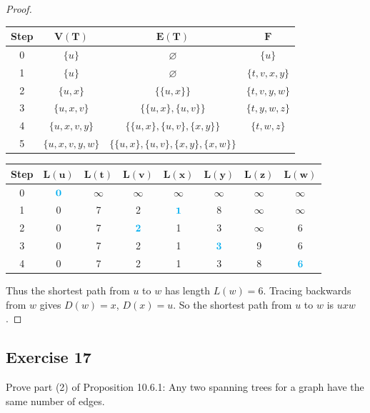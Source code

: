 \documentclass[14pt]{extarticle}
\newcommand{\es}{\varnothing}
\newcommand{\cy}{\color{cyan}}
\begin{document}
\begin{proof}
\begin{center}
\begin{tabular}{|c|c|c|c|}
\hline
{\bf \cy Step} & {\cy \(\bm{V(T)}\)} & {\cy \(\bm{E(T)}\)} & {\cy \(\bm{F}\)}  \\
\hline
0 & \(\{u\}\) & \(\es\) & \(\{u\}\) \\
1 & \(\{u\}\) & \(\es\) & \(\{t,v,x,y\}\) \\
2 & \(\{u,x\}\) & \(\{\{u,x\}\}\) & \(\{t,v,y,w\}\) \\
3 & \(\{u,x,v\}\) & \(\{\{u,x\}, \{u,v\}\}\) & \(\{t,y,w,z\}\) \\
4 & \(\{u,x,v,y\}\) & \(\{\{u,x\}, \{u,v\}, \{x,y\}\}\) & \(\{t,w,z\}\) \\
5 & \(\{u,x,v,y,w\}\) & \(\{\{u,x\}, \{u,v\}, \{x,y\}, \{x,w\}\}\) &  \\
\hline
\end{tabular}

\begin{tabular}{|c|c|c|c|c|c|c|c|}
\hline
{\bf \cy Step} & {\cy \(\bm{L(u)}\)} & {\cy\(\bm{L(t)}\)} & {\cy\(\bm{L(v)}\)} & {\cy\(\bm{L(x)}\)} & {\cy\(\bm{L(y)}\)} &  {\cy\(\bm{L(z)}\)} & {\cy\(\bm{L(w)}\)}\\
\hline
0 & \({\cy \bm{0}}\) & \(\infty\) & \(\infty\) & \(\infty\) & \(\infty\) & \(\infty\) & \(\infty\) \\
1 & 0 & 7 & 2 & \({\cy \bm{1}}\) & 8 & \(\infty\) & \(\infty\) \\
2 & 0 & 7 & \({\cy \bm{2}}\) & 1 & 3 & \(\infty\) & 6 \\
3 & 0 & 7 & 2 & 1 & \({\cy \bm{3}}\) & 9 & 6 \\
4 & 0 & 7 & 2 & 1 & 3 & 8 & \({\cy \bm{6}}\) \\
\hline
\end{tabular}
\end{center}

Thus the shortest path from \(u\) to \(w\) has length \(L(w) = 6\). Tracing backwards from \(w\) gives \(D(w) = x\), 
\(D(x) = u\). So the shortest path from \(u\) to \(w\) is \(uxw\).
\end{proof}

\subsection{Exercise 17}
Prove part (2) of Proposition 10.6.1: Any two spanning trees for a graph have the same number of edges.
\end{document}
